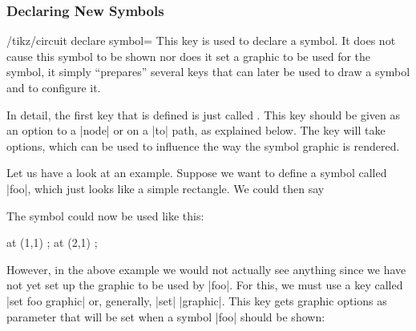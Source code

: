 \subsubsection{Declaring New Symbols}

\begin{key}{/tikz/circuit declare symbol=}
    This key is used to declare a symbol. It does not cause this symbol to be
    shown nor does it set a graphic to be used for the symbol, it simply
    ``prepares'' several keys that can later be used to draw a symbol and to
    configure it.

    In detail, the first key that is defined is just called . This
    key should be given as an option to a |node| or on a |to| path, as
    explained below. The key will take options, which can be used to influence
    the way the symbol graphic is rendered.

    Let us have a look at an example. Suppose we want to define a symbol called
    |foo|, which just looks like a simple rectangle. We could then say
\begin{codeexample}
\tikzset{circuit declare symbol=foo}
\end{codeexample}
    The symbol could now be used like this:
\begin{codeexample}
  \node [foo]       at (1,1) {};
  \node [foo={red}] at (2,1) {};
\end{codeexample}

    However, in the above example we would not actually see anything since we
    have not yet set up the graphic to be used by |foo|. For this, we must use
    a key called |set foo graphic| or, generally, |set|  |graphic|.
    This key gets graphic options as parameter that will be set when a symbol
    |foo| should be shown:
\begin{codeexample}[preamble={\usetikzlibrary{circuits}}]
\end{codeexample}


\end{key}

